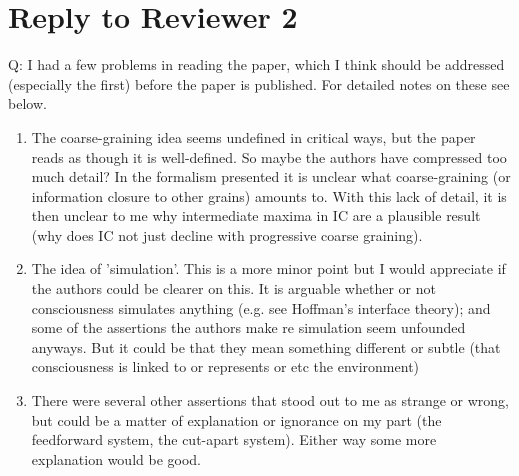 \documentclass[utf8]{article}
\newcounter{cQuestion}[section]
\newenvironment{question}
    {\refstepcounter{cQuestion}\color{Blue}\noindent\newline Q\thecQuestion:}
    {~\newline}
\begin{document}
    \section{Reply to Reviewer 2}
        \begin{question}
			I had a few problems in reading the paper, which I think should be addressed (especially the first) before the paper is published. For detailed notes on these see below.
			
			\begin{enumerate}
				\item The coarse-graining idea seems undefined in critical ways, but the paper reads as though it is well-defined. So maybe the authors have compressed too much detail? In the formalism presented it is unclear what coarse-graining (or information closure to other grains) amounts to. With this lack of detail, it is then unclear to me why intermediate maxima in IC are a plausible result (why does IC not just decline with progressive coarse graining).
				
				\item The idea of 'simulation'. This is a more minor point but I would appreciate if the authors could be clearer on this. It is arguable whether or not consciousness simulates anything (e.g. see Hoffman's interface theory); and some of the assertions the authors make re simulation seem unfounded anyways. But it could be that they mean something different or subtle (that consciousness is linked to or represents or etc the environment)
				
				\item There were several other assertions that stood out to me as strange or wrong, but could be a matter of explanation or ignorance on my part (the feedforward system, the cut-apart system). Either way some more explanation would be good.
			\end{enumerate}
        \end{question}
    
\end{document}
